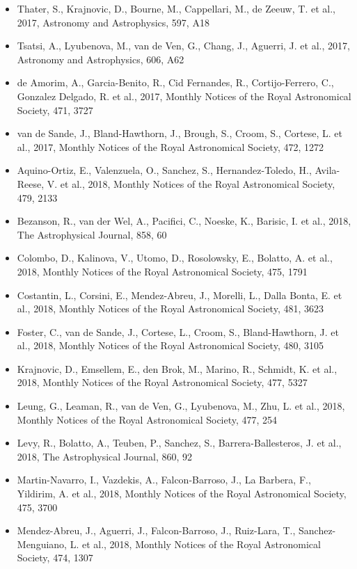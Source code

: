 \documentclass{letter}
\begin{document}
\begin{enumerate}
\begin{itemize}
\item Thater, S., Krajnovic, D., Bourne, M., Cappellari, M., de Zeeuw, T. et al., 2017, Astronomy and Astrophysics, 597, A18
\item Tsatsi, A., Lyubenova, M., van de Ven, G., Chang, J., Aguerri, J. et al., 2017, Astronomy and Astrophysics, 606, A62
\item de Amorim, A., Garcia-Benito, R., Cid Fernandes, R., Cortijo-Ferrero, C., Gonzalez Delgado, R. et al., 2017, Monthly Notices of the Royal Astronomical Society, 471, 3727
\item van de Sande, J., Bland-Hawthorn, J., Brough, S., Croom, S., Cortese, L. et al., 2017, Monthly Notices of the Royal Astronomical Society, 472, 1272
\item Aquino-Ortiz, E., Valenzuela, O., Sanchez, S., Hernandez-Toledo, H., Avila-Reese, V. et al., 2018, Monthly Notices of the Royal Astronomical Society, 479, 2133
\item Bezanson, R., van der Wel, A., Pacifici, C., Noeske, K., Barisic, I. et al., 2018, The Astrophysical Journal, 858, 60
\item Colombo, D., Kalinova, V., Utomo, D., Rosolowsky, E., Bolatto, A. et al., 2018, Monthly Notices of the Royal Astronomical Society, 475, 1791
\item Costantin, L., Corsini, E., Mendez-Abreu, J., Morelli, L., Dalla Bonta, E. et al., 2018, Monthly Notices of the Royal Astronomical Society, 481, 3623
\item Foster, C., van de Sande, J., Cortese, L., Croom, S., Bland-Hawthorn, J. et al., 2018, Monthly Notices of the Royal Astronomical Society, 480, 3105
\item Krajnovic, D., Emsellem, E., den Brok, M., Marino, R., Schmidt, K. et al., 2018, Monthly Notices of the Royal Astronomical Society, 477, 5327
\item Leung, G., Leaman, R., van de Ven, G., Lyubenova, M., Zhu, L. et al., 2018, Monthly Notices of the Royal Astronomical Society, 477, 254
\item Levy, R., Bolatto, A., Teuben, P., Sanchez, S., Barrera-Ballesteros, J. et al., 2018, The Astrophysical Journal, 860, 92
\item Martin-Navarro, I., Vazdekis, A., Falcon-Barroso, J., La Barbera, F., Yildirim, A. et al., 2018, Monthly Notices of the Royal Astronomical Society, 475, 3700
\item Mendez-Abreu, J., Aguerri, J., Falcon-Barroso, J., Ruiz-Lara, T., Sanchez-Menguiano, L. et al., 2018, Monthly Notices of the Royal Astronomical Society, 474, 1307

\end{itemize}
\end{enumerate}
\end{document}
